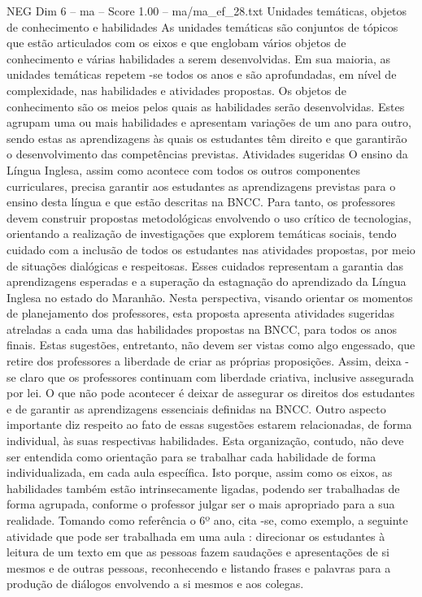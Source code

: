 \begin{textsample}{NEG Dim 6 – ma – Score 1.00 – ma/ma\_ef\_28.txt}  \label{ex:f6_neg_198}
Unidades temáticas, objetos de conhecimento e habilidades As unidades temáticas são conjuntos de tópicos que estão articulados com os eixos e que englobam vários objetos de conhecimento e várias habilidades a serem desenvolvidas.
Em sua maioria, as unidades temáticas repetem -se todos os anos e são aprofundadas, em nível de complexidade, nas habilidades e atividades propostas.
Os objetos de conhecimento são os meios pelos quais as habilidades serão desenvolvidas.
Estes agrupam uma ou mais habilidades e apresentam variações de um ano para outro, sendo estas as aprendizagens às quais os estudantes têm direito e que garantirão o desenvolvimento das competências previstas.
Atividades sugeridas O ensino da Língua Inglesa, assim como acontece com todos os outros componentes curriculares, precisa garantir aos estudantes as aprendizagens previstas para o ensino desta língua e que estão descritas na BNCC.
Para tanto, os professores devem construir propostas metodológicas envolvendo o uso crítico de tecnologias, orientando a realização de investigações que explorem temáticas sociais, tendo cuidado com a inclusão de todos os estudantes nas atividades propostas, por meio de situações dialógicas e respeitosas.
Esses cuidados representam a garantia das aprendizagens esperadas e a superação da estagnação do aprendizado da Língua Inglesa no estado do Maranhão.
Nesta perspectiva, visando orientar os momentos de planejamento dos professores, esta proposta apresenta atividades sugeridas atreladas a cada uma das habilidades propostas na BNCC, para todos os anos finais.
Estas sugestões, entretanto, não devem ser vistas como algo engessado, que retire dos professores a liberdade de criar as próprias proposições.
Assim, deixa -se claro que os professores continuam com liberdade criativa, inclusive assegurada por lei.
O que não pode acontecer é deixar de assegurar os direitos dos estudantes e de garantir as aprendizagens essenciais definidas na BNCC.
Outro aspecto importante diz respeito ao fato de essas sugestões estarem relacionadas, de forma individual, às suas respectivas habilidades.
Esta organização, contudo, não deve ser entendida como orientação para se trabalhar cada habilidade de forma individualizada, em cada aula específica.
Isto porque, assim como os eixos, as habilidades também estão intrinsecamente ligadas, podendo ser trabalhadas de forma agrupada, conforme o professor julgar ser o mais apropriado para a sua realidade.
Tomando como referência o 6º ano, cita -se, como exemplo, a seguinte atividade que pode ser trabalhada em uma aula : direcionar os estudantes à leitura de um texto em que as pessoas fazem saudações e apresentações de si mesmos e de outras pessoas, reconhecendo e listando frases e palavras para a produção de diálogos envolvendo a si mesmos e aos colegas.

\end{textsample}
